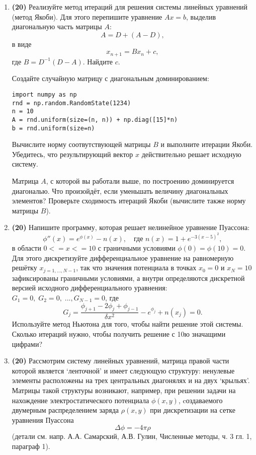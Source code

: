 \documentclass[prb,papersize=a4paper,notitlepage]{revtex4-1}%
\begin{document}
\begin{enumerate}
\item \textbf{(20)}
Реализуйте метод итераций для решения системы линейных уравнений (метод Якоби). Для этого перепишите уравнение $Ax=b$, выделив диагональную часть матрицы $A$:
$$
A = D + (A - D),
$$ в виде
$$
x_{n+1}=B x_n + c,
$$
где $B = D^{-1}(D-A)$. Найдите $c$.

Создайте случайную матрицу с диагональным доминированием:
\lstset{language=Python}
\lstset{frame=lines}
\lstset{basicstyle=\ttfamily}
\begin{lstlisting}
import numpy as np
rnd = np.random.RandomState(1234)
n = 10
A = rnd.uniform(size=(n, n)) + np.diag([15]*n)
b = rnd.uniform(size=n)
\end{lstlisting}
Вычислите норму соотвутствующей матрицы $B$ и выполните итерации Якоби. Убедитесь, что результирующий вектор $x$ действительно решает исходную систему.

Матрица $A$, с которой вы работали выше, по построению доминируется диагональю. Что произойдёт, если уменьшать величину диагональных элементов? Проверьте сходимость итераций Якоби (вычислите также норму матрицы $B$).

\item \textbf{(20)}
Напишите программу, которая решает нелинейное уравнение Пуассона:
$$
\phi''(x)=e^{\phi(x)} - n(x),\quad\textrm{где }n(x)=1+e^{-3(x-5)^2},
$$
в области $0<=x<=10$ с граничными условиями $\phi(0)=\phi(10)=0$. Для этого дискретизуйте дифференциальное уравнение на равномерную решётку
$x_{j=1,...,N-1}$, так что значения потенциала в точках $x_0=0$ и $x_{N}=10$ зафиксированы граничными условиями, а внутри определяются дискретной версией исходного дифференциального уравнения:  $G_1=0,\;G_2=0,\;...,G_{N-1}=0$, где
$$
G_j=\frac{\phi_{j+1}-2\phi_j+\phi_{j-1}}{\delta x^2} - e^{\phi_j} + n(x_j)=0.
$$
Используйте метод Ньютона для того, чтобы найти решение этой системы. Сколько итераций нужно, чтобы получить решение с 10ю значащими цифрами?

\item \textbf{(20)}
Рассмотрим систему линейных уравнений, матрица правой части которой является `ленточной' и имеет следующую структуру: ненулевые элементы расположены на трех центральных диагонялях и на двух `крыльях'. Матрицы такой структуры возникают, например, при решении задачи на нахождение электростатического потенциала $\phi(x, y)$, cоздаваемого двумерным распределением заряда $\rho(x, y)$ при дискретизации на сетке уравнения Пуассона
$$ \Delta \phi = -4\pi \rho$$ (детали см. напр. А.А. Самарский, А.В. Гулин, Численные методы, ч. 3 гл. 1, параграф 1). 


\end{enumerate}
\end{document}
